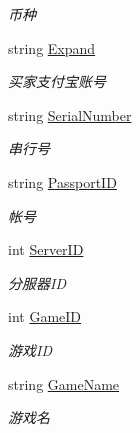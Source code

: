 \begin{DoxyCompactItemize}
\begin{DoxyCompactList}\small\item\em 币种 \end{DoxyCompactList}\item 
string \mbox{\hyperlink{class_t_net_1_1_pay_1_1_order_info_a9da467a7fa9b65e209abd5626e478926}{Expand}}
\begin{DoxyCompactList}\small\item\em 买家支付宝账号 \end{DoxyCompactList}\item 
string \mbox{\hyperlink{class_t_net_1_1_pay_1_1_order_info_a899e39f05f39d5398c21ed5f526762e5}{Serial\+Number}}
\begin{DoxyCompactList}\small\item\em 串行号 \end{DoxyCompactList}\item 
string \mbox{\hyperlink{class_t_net_1_1_pay_1_1_order_info_a2ed2d16ba1142df32d4ce3ac818488e7}{Passport\+ID}}
\begin{DoxyCompactList}\small\item\em 帐号 \end{DoxyCompactList}\item 
int \mbox{\hyperlink{class_t_net_1_1_pay_1_1_order_info_a32262910c98ca4edbddce577a7eacadc}{Server\+ID}}
\begin{DoxyCompactList}\small\item\em 分服器\+ID \end{DoxyCompactList}\item 
int \mbox{\hyperlink{class_t_net_1_1_pay_1_1_order_info_aa51a5953a084ffe87b08927112fcb987}{Game\+ID}}
\begin{DoxyCompactList}\small\item\em 游戏\+ID \end{DoxyCompactList}\item 
string \mbox{\hyperlink{class_t_net_1_1_pay_1_1_order_info_a7186b320c12a48deee7a508769ad1e04}{Game\+Name}}
\begin{DoxyCompactList}\small\item\em 游戏名 \end{DoxyCompactList}\item 

\end{DoxyCompactItemize}
